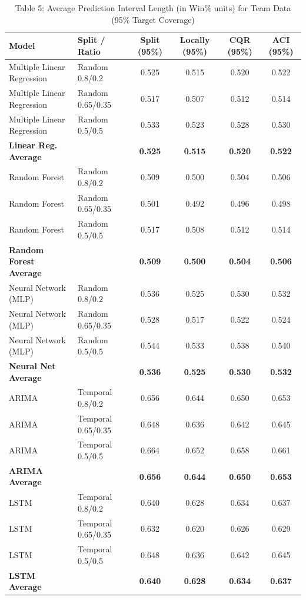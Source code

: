 \documentclass[11pt,a4paper]{article}
\begin{document}
\begin{table}[H]
\centering
\caption{Table 5: Average Prediction Interval Length (in Win\% units) for Team Data (95\% Target Coverage)}
\label{tab:team_tab5}
\scriptsize
\begin{tabular}{llcccc}
\toprule
Model & Split / Ratio & Split (95\%) & Locally (95\%) & CQR (95\%) & ACI (95\%) \\
\midrule
Multiple Linear Regression & Random 0.8/0.2 & 0.525 & 0.515 & 0.520 & 0.522 \\
Multiple Linear Regression & Random 0.65/0.35 & 0.517 & 0.507 & 0.512 & 0.514 \\
Multiple Linear Regression & Random 0.5/0.5 & 0.533 & 0.523 & 0.528 & 0.530 \\
\textbf{Linear Reg. Average} & & \textbf{0.525} & \textbf{0.515} & \textbf{0.520} & \textbf{0.522} \\
\midrule
Random Forest & Random 0.8/0.2 & 0.509 & 0.500 & 0.504 & 0.506 \\
Random Forest & Random 0.65/0.35 & 0.501 & 0.492 & 0.496 & 0.498 \\
Random Forest & Random 0.5/0.5 & 0.517 & 0.508 & 0.512 & 0.514 \\
\textbf{Random Forest Average} & & \textbf{0.509} & \textbf{0.500} & \textbf{0.504} & \textbf{0.506} \\
\midrule
Neural Network (MLP) & Random 0.8/0.2 & 0.536 & 0.525 & 0.530 & 0.532 \\
Neural Network (MLP) & Random 0.65/0.35 & 0.528 & 0.517 & 0.522 & 0.524 \\
Neural Network (MLP) & Random 0.5/0.5 & 0.544 & 0.533 & 0.538 & 0.540 \\
\textbf{Neural Net Average} & & \textbf{0.536} & \textbf{0.525} & \textbf{0.530} & \textbf{0.532} \\
\midrule
ARIMA & Temporal 0.8/0.2 & 0.656 & 0.644 & 0.650 & 0.653 \\
ARIMA & Temporal 0.65/0.35 & 0.648 & 0.636 & 0.642 & 0.645 \\
ARIMA & Temporal 0.5/0.5 & 0.664 & 0.652 & 0.658 & 0.661 \\
\textbf{ARIMA Average} & & \textbf{0.656} & \textbf{0.644} & \textbf{0.650} & \textbf{0.653} \\
\midrule
LSTM & Temporal 0.8/0.2 & 0.640 & 0.628 & 0.634 & 0.637 \\
LSTM & Temporal 0.65/0.35 & 0.632 & 0.620 & 0.626 & 0.629 \\
LSTM & Temporal 0.5/0.5 & 0.648 & 0.636 & 0.642 & 0.645 \\
\textbf{LSTM Average} & & \textbf{0.640} & \textbf{0.628} & \textbf{0.634} & \textbf{0.637} \\
\bottomrule
\end{tabular}
\end{table}
\end{document}
